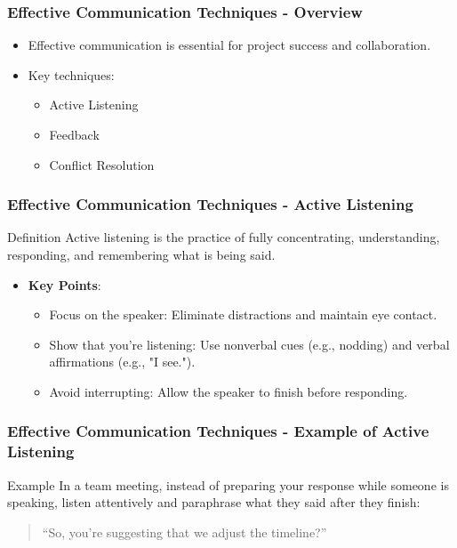 \documentclass[aspectratio=169]{beamer}
\begin{document}
\begin{frame}[fragile]
    \frametitle{Effective Communication Techniques - Overview}
    \begin{itemize}
        \item Effective communication is essential for project success and collaboration.
        \item Key techniques:
        \begin{itemize}
            \item Active Listening
            \item Feedback
            \item Conflict Resolution
        \end{itemize}
    \end{itemize}
\end{frame}

\begin{frame}[fragile]
    \frametitle{Effective Communication Techniques - Active Listening}
    \begin{block}{Definition}
        Active listening is the practice of fully concentrating, understanding, responding, and remembering what is being said.
    \end{block}
    \begin{itemize}
        \item \textbf{Key Points}:
        \begin{itemize}
            \item Focus on the speaker: Eliminate distractions and maintain eye contact.
            \item Show that you're listening: Use nonverbal cues (e.g., nodding) and verbal affirmations (e.g., "I see.").
            \item Avoid interrupting: Allow the speaker to finish before responding.
        \end{itemize}
    \end{itemize}
\end{frame}

\begin{frame}[fragile]
    \frametitle{Effective Communication Techniques - Example of Active Listening}
    \begin{block}{Example}
        In a team meeting, instead of preparing your response while someone is speaking, listen attentively and paraphrase what they said after they finish:
        \begin{quote}
            “So, you’re suggesting that we adjust the timeline?”
        \end{quote}
    \end{block}
\end{frame}
\end{document}
